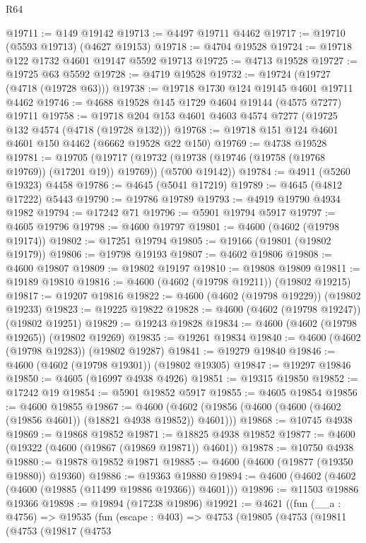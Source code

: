 \begin{lexlean}{R64}
\begin{coremodule}
@19711 := @149 @19142
@19713 := @4497 @19711 @4462
@19717 := @19710 (@5593 @19713) (@4627 @19153)
@19718 := @4704 @19528
@19724 := @19718 @122 @1732 @4601 @19147 @5592 @19713
@19725 := @4713 @19528
@19727 := @19725 @63 @5592
@19728 := @4719 @19528
@19732 := @19724 (@19727 (@4718 (@19728 @63)))
@19738 := @19718 @1730 @124 @19145 @4601 @19711 @4462
@19746 := @4688 @19528 @145 @1729 @4604 @19144 (@4575 @7277) @19711
@19758 := @19718 @204 @153 @4601 @4603 @4574 @7277 (@19725 @132 @4574 (@4718 (@19728 @132)))
@19768 := @19718 @151 @124 @4601 @4601 @150 @4462 (@6662 @19528 @22 @150)
@19769 := @4738 @19528
@19781 := @19705
    (@19717 (@19732 (@19738 (@19746 (@19758 (@19768 @19769)) (@17201 @19)) @19769)) (@5700 @19142))
@19784 := @4911 (@5260 @19323) @4458
@19786 := @4645 (@5041 @17219)
@19789 := @4645 (@4812 @17222) @5443
@19790 := @19786 @19789
@19793 := @4919 @19790 @4934 @1982
@19794 := @17242 @71
@19796 := @5901 @19794 @5917
@19797 := @4605 @19796
@19798 := @4600 @19797
@19801 := @4600 (@4602 (@19798 @19174))
@19802 := @17251 @19794
@19805 := @19166 (@19801 (@19802 @19179))
@19806 := @19798 @19193
@19807 := @4602 @19806
@19808 := @4600 @19807
@19809 := @19802 @19197
@19810 := @19808 @19809
@19811 := @19189 @19810
@19816 := @4600 (@4602 (@19798 @19211)) (@19802 @19215)
@19817 := @19207 @19816
@19822 := @4600 (@4602 (@19798 @19229)) (@19802 @19233)
@19823 := @19225 @19822
@19828 := @4600 (@4602 (@19798 @19247)) (@19802 @19251)
@19829 := @19243 @19828
@19834 := @4600 (@4602 (@19798 @19265)) (@19802 @19269)
@19835 := @19261 @19834
@19840 := @4600 (@4602 (@19798 @19283)) (@19802 @19287)
@19841 := @19279 @19840
@19846 := @4600 (@4602 (@19798 @19301)) (@19802 @19305)
@19847 := @19297 @19846
@19850 := @4605 (@16997 @4938 @4926)
@19851 := @19315 @19850
@19852 := @17242 @19
@19854 := @5901 @19852 @5917
@19855 := @4605 @19854
@19856 := @4600 @19855
@19867 := @4600 (@4602 (@19856 (@4600 (@4600 (@4602 (@19856 @4601)) (@18821 @4938 @19852)) @4601)))
@19868 := @10745 @4938
@19869 := @19868 @19852
@19871 := @18825 @4938 @19852
@19877 := @4600 (@19322 (@4600 (@19867 (@19869 @19871)) @4601))
@19878 := @10750 @4938
@19880 := @19878 @19852 @19871
@19885 := @4600 (@4600 (@19877 (@19350 @19880)) @19360)
@19886 := @19363 @19880
@19894 := @4600 (@4602 (@4602 (@4600 (@19885 (@11499 @19886 @19366)) @4601)))
@19896 := @11503 @19886 @19366
@19898 := @19894 (@17238 @19896)
@19921 := @4621
    ((fun (__a : @4756) =>
    @19535
      (fun (escape : @403) =>
      @4753
        (@19805
          (@4753
            (@19811
              (@4753
                (@19817
                  (@4753

\end{coremodule}
\end{lexlean}

